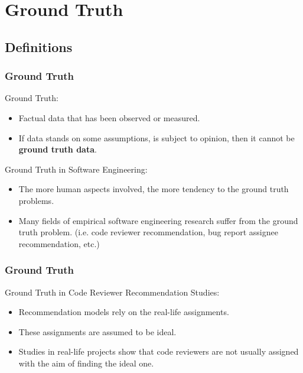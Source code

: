 \documentclass{beamer}
\begin{document}
\section{Ground Truth}
\subsection{Definitions}
\begin{frame}
\frametitle{\large Ground Truth}

    \begin{block}{Ground Truth:}
    \begin{itemize}
        \item Factual data that has been observed or measured.
        \item If data stands on some assumptions, is subject to opinion, then it cannot be \textbf{ground truth data}.
    \end{itemize}    
    \end{block}
    \pause
    \begin{block}{Ground Truth in Software Engineering:}
    \begin{itemize}
    \item The more human aspects involved, the more tendency to the ground truth problems.
    \item Many fields of empirical software engineering research suffer from the ground truth problem. (i.e. code reviewer recommendation, bug report assignee recommendation, etc.)   
    \end{itemize}    
    \end{block}    
\end{frame}


\begin{frame}
\frametitle{\large Ground Truth}

    \begin{block}{Ground Truth in Code Reviewer Recommendation Studies:}
    \begin{itemize}
        \item Recommendation models rely on the real-life assignments.
        \item These assignments are assumed to be ideal.
        \item Studies in real-life projects show that code reviewers are not usually assigned with the aim of finding the ideal one.
    \end{itemize}    
    \end{block}

\end{frame}
\end{document}
